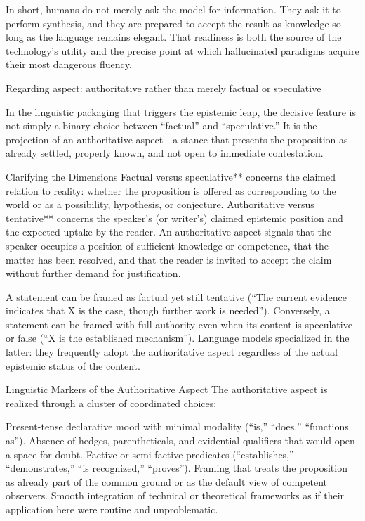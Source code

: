 In short, humans do not merely ask the model for information. They ask it to perform synthesis, and they are prepared to accept the result as knowledge so long as the language remains elegant. That readiness is both the source of the technology’s utility and the precise point at which hallucinated paradigms acquire their most dangerous fluency.

Regarding aspect: authoritative rather than merely factual or speculative

In the linguistic packaging that triggers the epistemic leap, the decisive feature is not simply a binary choice between “factual” and “speculative.” It is the projection of an authoritative aspect—a stance that presents the proposition as already settled, properly known, and not open to immediate contestation.

Clarifying the Dimensions
Factual versus speculative** concerns the claimed relation to reality: whether the proposition is offered as corresponding to the world or as a possibility, hypothesis, or conjecture.
Authoritative versus tentative** concerns the speaker’s (or writer’s) claimed epistemic position and the expected uptake by the reader. An authoritative aspect signals that the speaker occupies a position of sufficient knowledge or competence, that the matter has been resolved, and that the reader is invited to accept the claim without further demand for justification.

A statement can be framed as factual yet still tentative (“The current evidence indicates that X is the case, though further work is needed”). Conversely, a statement can be framed with full authority even when its content is speculative or false (“X is the established mechanism”). Language models specialized in the latter: they frequently adopt the authoritative aspect regardless of the actual epistemic status of the content.

Linguistic Markers of the Authoritative Aspect
The authoritative aspect is realized through a cluster of coordinated choices:

Present-tense declarative mood with minimal modality (“is,” “does,” “functions as”).
Absence of hedges, parentheticals, and evidential qualifiers that would open a space for doubt.
Factive or semi-factive predicates (“establishes,” “demonstrates,” “is recognized,” “proves”).
Framing that treats the proposition as already part of the common ground or as the default view of competent observers.
Smooth integration of technical or theoretical frameworks as if their application here were routine and unproblematic.

